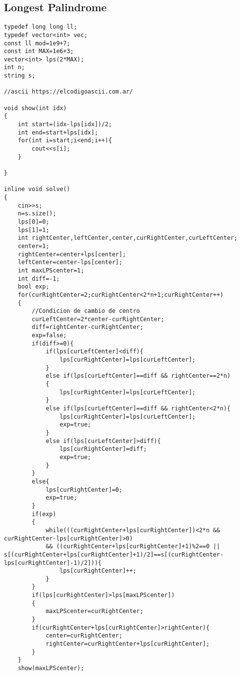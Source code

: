 \documentclass[10pt]{article}
\begin{document}
\begin{multicols*}{2}
\subsection{Longest Palindrome}

\begin{lstlisting}[style=compactcpp]
typedef long long ll;
typedef vector<int> vec;
const ll mod=1e9+7;
const int MAX=1e6+3;
vector<int> lps(2*MAX);
int n;
string s;

//ascii https://elcodigoascii.com.ar/

void show(int idx)
{
    int start=(idx-lps[idx])/2;
    int end=start+lps[idx];
    for(int i=start;i<end;i++){
        cout<<s[i];
    }
    
}

inline void solve()
{
    cin>>s;
    n=s.size();
    lps[0]=0;
    lps[1]=1;
    int rightCenter,leftCenter,center,curRightCenter,curLeftCenter;
    center=1;
    rightCenter=center+lps[center];
    leftCenter=center-lps[center];
    int maxLPScenter=1;
    int diff=-1;
    bool exp;
    for(curRightCenter=2;curRightCenter<2*n+1;curRightCenter++)
    {
        //Condicion de cambio de centro
        curLeftCenter=2*center-curRightCenter;
        diff=rightCenter-curRightCenter;
        exp=false;
        if(diff>=0){
            if(lps[curLeftCenter]<diff){
                lps[curRightCenter]=lps[curLeftCenter];
            }
            else if(lps[curLeftCenter]==diff && rightCenter==2*n)
            {
                lps[curRightCenter]=lps[curLeftCenter];
            }
            else if(lps[curLeftCenter]==diff && rightCenter<2*n){
                lps[curRightCenter]=lps[curLeftCenter];
                exp=true;
            }
            else if(lps[curLeftCenter]>diff){
                lps[curRightCenter]=diff;
                exp=true;
            }
        }
        else{
            lps[curRightCenter]=0;
            exp=true;
        }
        if(exp)
        {
            while(((curRightCenter+lps[curRightCenter])<2*n && curRightCenter-lps[curRightCenter]>0) 
            && ((curRightCenter+lps[curRightCenter]+1)%2==0 || s[(curRightCenter+lps[curRightCenter]+1)/2]==s[(curRightCenter-lps[curRightCenter]-1)/2])){
                lps[curRightCenter]++;
            }
        }
        if(lps[curRightCenter]>lps[maxLPScenter])
        {
            maxLPScenter=curRightCenter;
        }
        if(curRightCenter+lps[curRightCenter]>rightCenter){
            center=curRightCenter;
            rightCenter=curRightCenter+lps[curRightCenter];
        }
    }
    show(maxLPScenter);


\end{lstlisting}
\end{multicols*}
\end{document}
